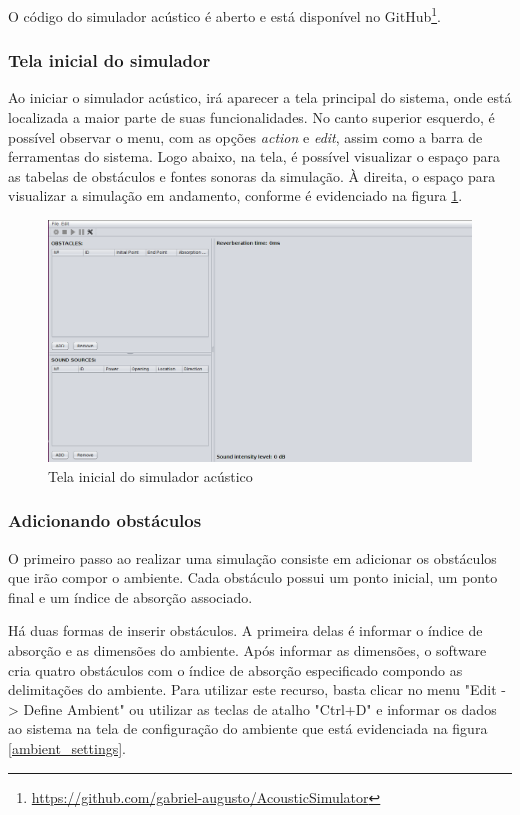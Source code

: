 O código do simulador acústico é aberto e está disponível no
GitHub\footnote{\url{https://github.com/gabriel-augusto/AcousticSimulator}}.

\subsubsection{Tela inicial do simulador}

Ao iniciar o simulador acústico, irá aparecer a tela principal do sistema, onde está localizada a maior parte de suas funcionalidades. No canto superior esquerdo, é possível observar o menu, com as opções \textit{action} e \textit{edit}, assim como a barra de ferramentas do sistema. Logo abaixo, na tela, é possível visualizar o espaço para as tabelas de obstáculos e fontes sonoras da simulação. À direita, o espaço para visualizar a simulação em andamento, conforme é evidenciado na figura \ref{tela_inicial}.

\begin{figure}[!htb]
\centering
\includegraphics[scale=0.35]{figuras/telas/tela_inicial}
\caption{Tela inicial do simulador acústico}
\label{tela_inicial}
\end{figure}

\subsubsection{Adicionando obstáculos}

O primeiro passo ao realizar uma simulação consiste em adicionar os obstáculos que irão compor o ambiente. Cada obstáculo possui um ponto inicial, um ponto final e um índice de absorção associado.

Há duas formas de inserir obstáculos. A primeira delas é informar o índice de absorção e as dimensões do ambiente. Após informar as dimensões, o software cria quatro obstáculos com o índice de absorção especificado compondo as delimitações do ambiente. Para utilizar este recurso, basta clicar no menu "Edit -> Define Ambient" ou utilizar as teclas de atalho "Ctrl+D" e informar os dados ao sistema na tela de configuração do ambiente que está evidenciada na figura \ref{ambient_settings}.

